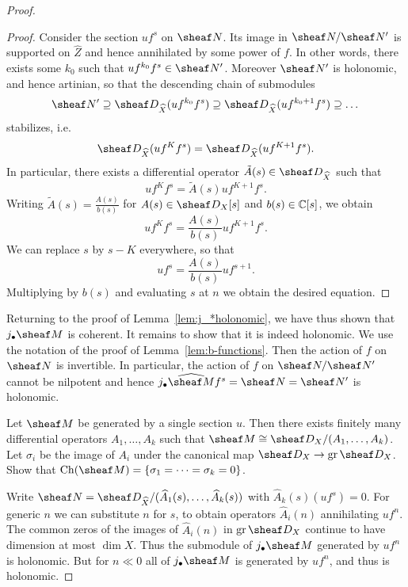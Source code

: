 \documentclass[number-in-sections,a4paper]{notes}
\begin{document}
\begin{proof}
\begin{proof}
        Consider the section $uf^s$ on $\sheaf N$.
        Its image in $\sheaf N/\sheaf N'$ is supported on $\widehat Z$ and hence annihilated by some power of $f$.
        In other words, there exists some $k_0$ such that $uf^{k_0}f^s \in \sheaf N'$.
        Moreover  $\sheaf N'$ is holonomic, and hence artinian, so that the descending chain of submodules
        \[
            \sheaf N' \supseteq
            \sD_{\widehat X}(uf^{k_0}f^s) \supseteq
            \sD_{\widehat X}(uf^{k_0+1}f^s) \supseteq
            \dots
        \]
        stabilizes, i.e.
        \[
            \sD_{\widehat X}(uf^{K}f^s) =
            \sD_{\widehat X}(uf^{K+1}f^s).
        \]
        In particular, there exists a differential operator $\tilde A(s) \in \sD_{\widehat X}$ such that
        \[
            uf^{K}f^s = \tilde A(s)uf^{K+1}f^s.
        \]
        Writing $\tilde A(s) = \frac{A(s)}{b(s)}$ for $A(s) \in \sD_X[s]$ and $b(s) \in {\mathbb{C}}[s]$, we obtain
        \[
            uf^{K}f^s = \frac{A(s)}{b(s)}uf^{K+1}f^s.
        \]
        We can replace $s$ by $s-K$ everywhere, so that
        \[
            uf^{s} = \frac{A(s)}{b(s)}uf^{s+1}.
        \]
        Multiplying by $b(s)$ and evaluating $s$ at $n$ we obtain the desired equation.
    \end{proof}

    Returning to the proof of Lemma~\ref{lem:j_*holonomic}, we have thus shown that $j_\bullet\sheaf M$ is coherent.
    It remains to show that it is indeed holonomic.
    We use the notation of the proof of Lemma~\ref{lem:b-functions}.
    Then the action of $f$ on $\sheaf N$ is invertible.
    In particular, the action of $f$ on $\sheaf N/\sheaf N'$ cannot be nilpotent and hence $j_\bullet \widehat{\sheaf M}f^s = \sheaf N = \sheaf N'$ is holonomic.

    \begin{Exercise}
        Let $\sheaf M$ be generated by a single section $u$.
        Then there exists finitely many differential operators $A_1,\dots,A_k$ such that $\sheaf M \cong \sD_X/(A_1,\dots,A_k)$.
        Let $\sigma_i$ be the image of $A_i$ under the canonical map $\sD_X \to \gr \sD_X$.
        Show that $\Ch(\sheaf M) = \{\sigma_1 = \dots = \sigma_k = 0\}$.
    \end{Exercise}

    Write $\sheaf N = \sD_{\widehat X}/(\widehat A_1(s), \dots, \widehat A_k(s))$ with $\widehat A_k(s) (uf^s) = 0$.
    For generic $n$ we can substitute $n$ for $s$, to obtain operators $\widehat A_i(n)$ annihilating $uf^n$.
    The common zeros of the images of $\widehat A_i(n)$ in $\gr \sD_X$ continue to have dimension at most $\dim X$.
    Thus the submodule of $j_\bullet\sheaf M$ generated by $uf^n$ is holonomic.
    But for $n \ll 0$ all of $j_\bullet\sheaf M$ is generated by $uf^n$, and thus is holonomic.
\end{proof}
\end{document}
